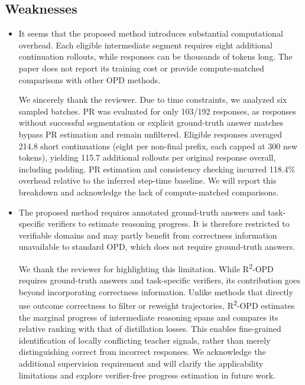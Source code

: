 \subsection*{Weaknesses}
\begin{itemize}
\item It seems that the proposed method introduces substantial computational overhead. Each eligible intermediate segment requires eight additional continuation rollouts, while responses can be thousands of tokens long. The paper does not report its training cost or provide compute-matched comparisons with other OPD methods.
\par{}
\begin{responsebox}[frametitle={Response to W1}]
We sincerely thank the reviewer. Due to time constraints, we analyzed six sampled batches. PR was evaluated for only 103/192 responses, as responses without successful segmentation or explicit ground-truth answer matches bypass PR estimation and remain unfiltered. Eligible responses averaged 214.8 short continuations (eight per non-final prefix, each capped at 300 new tokens), yielding 115.7 additional rollouts per original response overall, including padding. PR estimation and consistency checking incurred 118.4\% overhead relative to the inferred step-time baseline. We will report this breakdown and acknowledge the lack of compute-matched comparisons.
\end{responsebox}

\item The proposed method requires annotated ground-truth answers and task-specific verifiers to estimate reasoning progress. It is therefore restricted to verifiable domains and may partly benefit from correctness information unavailable to standard OPD, which does not require ground-truth answers.
\par{}
\begin{responsebox}[frametitle={Response to W2}]
We thank the reviewer for highlighting this limitation. While R\textsuperscript{2}-OPD requires ground-truth answers and task-specific verifiers, its contribution goes beyond incorporating correctness information. Unlike methods that directly use outcome correctness to filter or reweight trajectories, R\textsuperscript{2}-OPD estimates the marginal progress of intermediate reasoning spans and compares its relative ranking with that of distillation losses. This enables fine-grained identification of locally conflicting teacher signals, rather than merely distinguishing correct from incorrect responses. We acknowledge the additional supervision requirement and will clarify the applicability limitations and explore verifier-free progress estimation in future work.
\end{responsebox}


\end{itemize}
